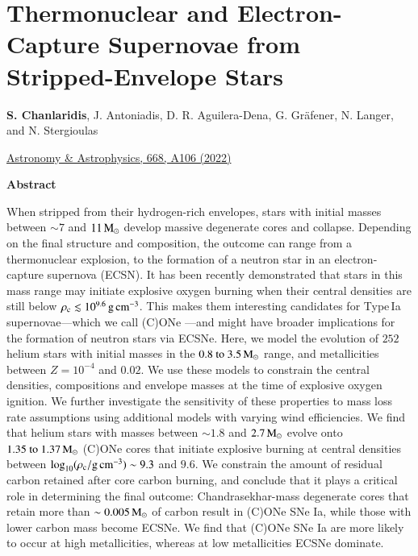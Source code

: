 \documentclass[main.tex]{subfiles}
\begin{document}
    \chapter[Thermonuclear and Electron-Capture Supernovae from Stripped-Envelope Stars]{Thermonuclear and Electron-Capture Supernovae from Stripped-Envelope Stars}
    \label{ch:tn_v_ec_sn}
    
    \begin{center}
        \textbf{S. Chanlaridis}, J. Antoniadis, D. R. Aguilera-Dena, G. Gr\"afener, N. Langer, and N. Stergioulas \\
        \begin{center}
            \href{https://www.aanda.org/articles/aa/full_html/2022/12/aa43035-22/aa43035-22.html}{Astronomy \& Astrophysics, 668, A106 (2022)}
        \end{center}
    \end{center}
        
        
    \begin{center}
        \textbf{\large Abstract}
    \end{center}

    When stripped from their hydrogen-rich envelopes, stars with initial masses between $\sim 7$ and $11\mathrm{\,M_\odot}$ develop massive degenerate cores and collapse. Depending on the final structure and composition, the outcome can range from a thermonuclear explosion, to the formation of a neutron star in an electron-capture supernova (ECSN). It has been recently demonstrated that stars in this mass range may initiate explosive oxygen burning when their central densities are still below $\rho_{\mathrm{c}} \lesssim 10^{9.6}\mathrm{\,g\,cm^{-3}}$. This makes them interesting candidates for Type\,Ia supernovae---which we call (C)ONe \ias---and might have broader implications for the formation of neutron stars via ECSNe. Here, we model the evolution of $252$ helium stars with initial masses in the $\numrange{0.8}{3.5}\msun$ range, and metallicities between $Z=10^{-4}$ and $0.02$. We use these models to constrain the central densities, compositions and envelope masses at the time of explosive oxygen ignition. We further investigate the sensitivity of these properties to mass loss rate assumptions using additional models with varying wind efficiencies. We find that helium stars with masses between $\sim1.8$ and $2.7\mathrm{\,M_\odot}$ evolve onto $\numrange{1.35}{1.37}\msun$ (C)ONe cores that initiate explosive burning at central densities between $\log_{10} (\rho_{\mathrm{c}}/ \mathrm{g\,cm^{-3}}) \sim 9.3$ and $9.6$. We constrain the amount of residual carbon retained after core carbon burning, and conclude that it plays a critical role in determining the final outcome: Chandrasekhar-mass degenerate cores that retain more than $\sim 0.005\mathrm{\,M_\odot}$ of carbon result in (C)ONe SNe Ia, while those with lower carbon mass become ECSNe. We find that (C)ONe SNe Ia are more likely to occur at high metallicities, whereas at low metallicities ECSNe dominate.
\end{document}
